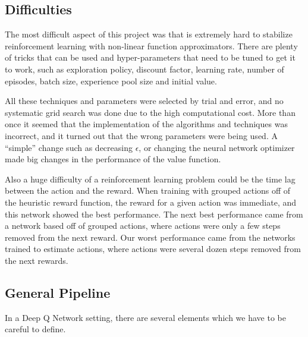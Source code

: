 \subsection{Difficulties}

The most difficult aspect of this project was that is extremely hard to stabilize reinforcement learning with non-linear function approximators. There are plenty of tricks that can be used and hyper-parameters that need to be tuned to get it to work, such as exploration policy, discount factor, learning rate, number of episodes, batch size, experience pool size and initial value.

All these techniques and parameters were selected by trial and error, and no systematic grid search was done due to the high computational cost. More than once it seemed that the implementation of the algorithms and techniques was incorrect, and it turned out that the wrong parameters were being used. A ``simple'' change such as decreasing $\epsilon$, or changing the neural network optimizer made big changes in the performance of the value function.

Also a huge difficulty of a reinforcement learning problem could be the time lag between the action and the reward. When training with grouped actions off of the heuristic reward function, the reward for a given action was immediate, and this network showed the best performance. The next best performance came from a network based off of grouped actions, where actions were only a few steps removed from the next reward. Our worst performance came from the networks trained to estimate actions, where actions were several dozen steps removed from the next rewards.

\subsection{General Pipeline}

In a Deep Q Network setting, there are several elements which we have to be careful to define.

